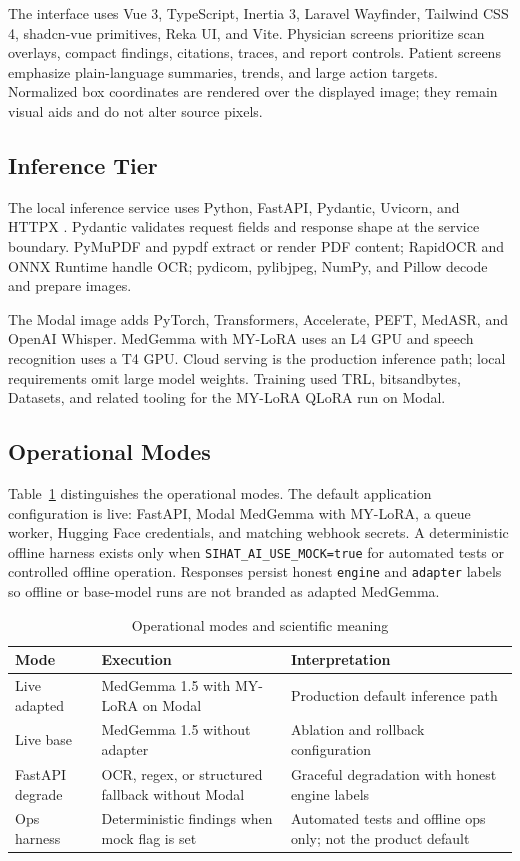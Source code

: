 \documentclass[conference]{IEEEtran}
\begin{document}
The interface uses Vue 3, TypeScript, Inertia 3, Laravel Wayfinder, Tailwind CSS 4, shadcn-vue primitives, Reka UI, and Vite. Physician screens prioritize scan overlays, compact findings, citations, traces, and report controls. Patient screens emphasize plain-language summaries, trends, and large action targets. Normalized box coordinates are rendered over the displayed image; they remain visual aids and do not alter source pixels.

\subsection{Inference Tier}

The local inference service uses Python, FastAPI, Pydantic, Uvicorn, and HTTPX \cite{fastapi}. Pydantic validates request fields and response shape at the service boundary. PyMuPDF and pypdf extract or render PDF content; RapidOCR and ONNX Runtime handle OCR; pydicom, pylibjpeg, NumPy, and Pillow decode and prepare images.

The Modal image adds PyTorch, Transformers, Accelerate, PEFT, MedASR, and OpenAI Whisper. MedGemma with MY-LoRA uses an L4 GPU and speech recognition uses a T4 GPU. Cloud serving is the production inference path; local requirements omit large model weights. Training used TRL, bitsandbytes, Datasets, and related tooling for the MY-LoRA QLoRA run on Modal.

\subsection{Operational Modes}

Table~\ref{tab:modes} distinguishes the operational modes. The default application configuration is live: FastAPI, Modal MedGemma with MY-LoRA, a queue worker, Hugging Face credentials, and matching webhook secrets. A deterministic offline harness exists only when \texttt{SIHAT\_AI\_USE\_MOCK=true} for automated tests or controlled offline operation. Responses persist honest \texttt{engine} and \texttt{adapter} labels so offline or base-model runs are not branded as adapted MedGemma.

\begin{table}[t]
\caption{Operational modes and scientific meaning}
\label{tab:modes}
\centering
\scriptsize
\begin{tabular}{p{}p{}p{}}
\toprule
Mode & Execution & Interpretation \\
\midrule
Live adapted & MedGemma 1.5 with MY-LoRA on Modal & Production default inference path \\
Live base & MedGemma 1.5 without adapter & Ablation and rollback configuration \\
FastAPI degrade & OCR, regex, or structured fallback without Modal & Graceful degradation with honest engine labels \\
Ops harness & Deterministic findings when mock flag is set & Automated tests and offline ops only; not the product default \\
\bottomrule
\end{tabular}
\end{table}
\end{document}
